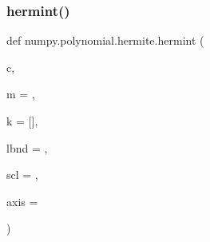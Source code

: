 \subsubsection{\texorpdfstring{hermint()}{hermint()}}
{\footnotesize\ttfamily def numpy.\+polynomial.\+hermite.\+hermint (\begin{DoxyParamCaption}\item[{}]{c,  }\item[{}]{m = {},  }\item[{}]{k = {\ttfamily \mbox{[}\mbox{]}},  }\item[{}]{lbnd = {},  }\item[{}]{scl = {},  }\item[{}]{axis = {} }\end{DoxyParamCaption})}

